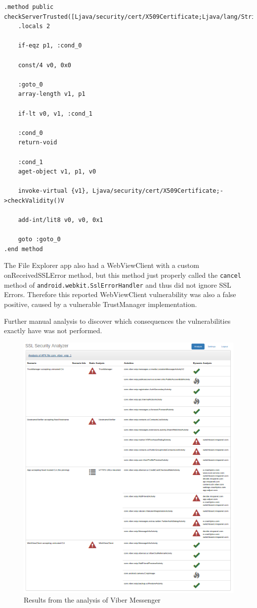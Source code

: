\documentclass[draft,final]{vutinfth} %
\begin{document}
\begin{lstlisting}[caption={Vulnerable X509TrustManager implementation in EFS File Explorer},label={lst:efs_smali},frame=tb,columns=fullflexible,breaklines]
.method public checkServerTrusted([Ljava/security/cert/X509Certificate;Ljava/lang/String;)V
    .locals 2

    if-eqz p1, :cond_0

    const/4 v0, 0x0

    :goto_0
    array-length v1, p1

    if-lt v0, v1, :cond_1

    :cond_0
    return-void

    :cond_1
    aget-object v1, p1, v0

    invoke-virtual {v1}, Ljava/security/cert/X509Certificate;->checkValidity()V

    add-int/lit8 v0, v0, 0x1

    goto :goto_0
.end method
\end{lstlisting}

The File Explorer app also had a WebViewClient with a custom onReceivedSSLError method, but this method just properly called the \texttt{cancel} method of \texttt{android.webkit\-.SslErrorHandler} and thus did not ignore SSL Errors. Therefore this reported WebViewClient vulnerability was also a false positive, caused by a vulnerable TrustManager implementation.

Further manual analysis to discover which consequences the vulnerabilities exactly have was not performed.

\begin{figure}
\caption{Results from the analysis of Viber Messenger}
\label{fig:matrix}
\includegraphics[width=\textwidth,height=1\textheight]{matrix.png}
\end{figure}
\end{document}
